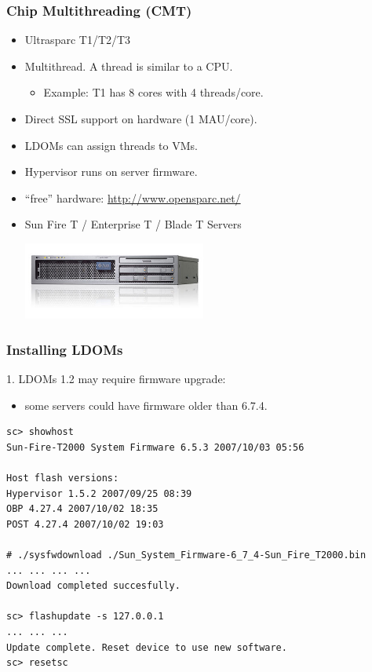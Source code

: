 \documentclass{beamer}
\begin{document}
\begin{frame}
\frametitle{Chip Multithreading (CMT)}


\begin{itemize}
\item Ultrasparc T1/T2/T3\pause
\item Multithread. A thread is similar to a CPU.\pause
\begin{itemize}
\item Example: T1 has 8 cores with 4 threads/core.\pause
\end{itemize}
\item Direct SSL support on hardware (1 MAU/core).\pause
\item LDOMs can assign threads to VMs.\pause
\item Hypervisor runs on server firmware.\pause
\item ``free'' hardware: \textcolor{red}{\url{http://www.opensparc.net/}}\pause
\item Sun Fire T / Enterprise T / Blade T Servers

\begin{flushright}
\includegraphics[width=6cm]{figs/sunT2000.jpg}
\end{flushright}

\end{itemize}


\end{frame}

\begin{frame}[fragile]
\frametitle{Installing LDOMs}

1. LDOMs 1.2 may require firmware upgrade:
\pause
\begin{itemize}
\item some servers could have firmware older than 6.7.4.
\end{itemize}

\pause

{\tiny
\begin{verbatim}
sc> showhost
Sun-Fire-T2000 System Firmware 6.5.3 2007/10/03 05:56

Host flash versions:
Hypervisor 1.5.2 2007/09/25 08:39
OBP 4.27.4 2007/10/02 18:35
POST 4.27.4 2007/10/02 19:03

# ./sysfwdownload ./Sun_System_Firmware-6_7_4-Sun_Fire_T2000.bin
... ... ... ...
Download completed succesfully.

sc> flashupdate -s 127.0.0.1
... ... ...
Update complete. Reset device to use new software.
sc> resetsc
\end{verbatim}
}

\end{frame}
\end{document}

